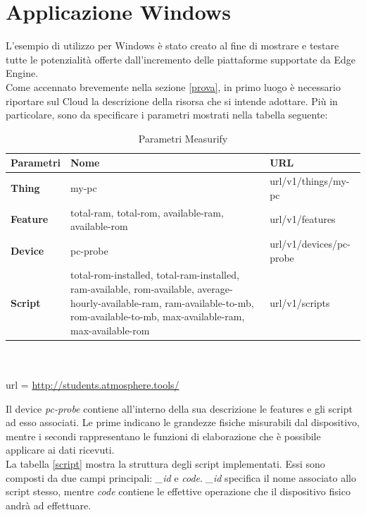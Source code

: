 \section{Applicazione Windows}
L'esempio di utilizzo per Windows è stato creato al fine di mostrare e testare tutte le potenzialità offerte dall'incremento delle piattaforme supportate da Edge Engine.\\
Come accennato brevemente nella sezione \ref{prova}, in primo luogo è necessario riportare sul Cloud la descrizione della risorsa che si intende adottare. Più in particolare, sono da specificare i parametri mostrati nella tabella seguente:
\begin{table}[H]
	\begin{tabular}{|p{}|p{}|p{}|}
		\hline
		\textbf{Parametri} & \textbf{Nome} & \textbf{URL}\\
		\hline
		\textbf{Thing} & my-pc & {{url}}/v1/things/my-pc\\
		\hline
		\textbf{Feature} & total-ram, total-rom, available-ram, available-rom & {{url}}/v1/features\\
		\hline
		\textbf{Device} & pc-probe & {{url}}/v1/devices/pc-probe\\	
		\hline
		\textbf{Script} & total-rom-installed, total-ram-installed, ram-available, rom-available, average-hourly-available-ram, ram-available-to-mb, rom-available-to-mb,  max-available-ram, max-available-rom & {{url}}/v1/scripts\\	
		\hline
	\end{tabular}
\\\\url = \url{http://students.atmosphere.tools/}
	\caption{Parametri Measurify}
	\label{paramMeas}
\end{table}
Il device \textit{pc-probe} contiene all'interno della sua descrizione le features e gli script ad esso associati. Le prime indicano le grandezze fisiche misurabili dal dispositivo, mentre i secondi rappresentano le funzioni di elaborazione che è possibile applicare ai dati ricevuti. \\
La tabella \ref{script} mostra la struttura degli script implementati. Essi sono composti da due campi principali: \textit{\_id} e \textit{code}.  \textit{\_id} specifica il nome associato allo script stesso, mentre  \textit{code} contiene le effettive operazione che il dispositivo fisico andrà ad effettuare. 
